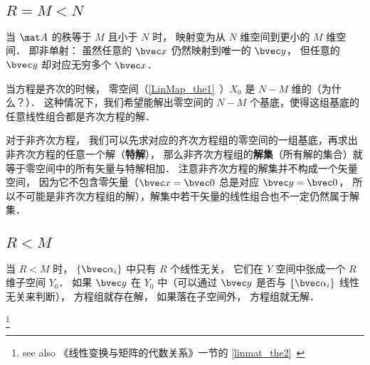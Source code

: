 \subsection{$R = M < N$}\label{LinEq_sub1}

当 $\mat A$ 的秩等于 $M$ 且小于 $N$ 时， 映射变为从 $N$ 维空间到更小的 $M$ 维空间． 即非单射： 虽然任意的 $\bvec x$ 仍然映射到唯一的 $\bvec y$， 但任意的 $\bvec y$ 却对应无穷多个 $\bvec x$． 


当方程是齐次的时候， 零空间（\autoref{LinMap_the1}~）$X_0$ 是 $N- M$ 维的（为什么？）． 这种情况下，我们希望能解出零空间的 $N - M$ 个基底，使得这组基底的任意线性组合都是齐次方程的解．

对于非齐次方程， 我们可以先求对应的齐次方程组的零空间的一组基底，再求出非齐次方程的任意一个解（\textbf{特解}）， 那么非齐次方程组的\textbf{解集}（所有解的集合）就等于零空间中的所有矢量与特解相加． 注意非齐次方程的解集并不构成一个矢量空间， 因为它不包含零矢量（$\bvec x = \bvec 0$ 总是对应 $\bvec y = \bvec 0$， 所以不可能是非齐次方程组的解），解集中若干矢量的线性组合也不一定仍然属于解集．

\subsection{$R < M$}
当 $R < M$ 时， $\{\bvec \alpha_i\}$ 中只有 $R$ 个线性无关， 它们在 $Y$ 空间中张成一个 $R$ 维子空间 $Y_0$． 如果 $\bvec y$ 在 $Y_0$ 中（可以通过 $\bvec y$ 是否与 $\{\bvec \alpha_i\}$ 线性无关来判断）， 方程组就存在解， 如果落在子空间外， 方程组就无解．

\footnote{see also 《线性变换与矩阵的代数关系》一节的 \autoref{linmat_the2}~}
